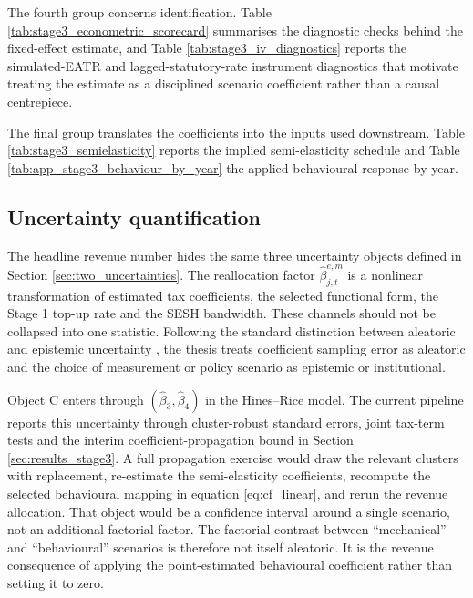 \documentclass[11pt,a4paper]{article}
\begin{document}




The fourth group concerns identification. Table \ref{tab:stage3_econometric_scorecard} summarises the diagnostic checks behind the fixed-effect estimate, and Table \ref{tab:stage3_iv_diagnostics} reports the simulated-EATR and lagged-statutory-rate instrument diagnostics that motivate treating the estimate as a disciplined scenario coefficient rather than a causal centrepiece.




The final group translates the coefficients into the inputs used downstream. Table \ref{tab:stage3_semielasticity} reports the implied semi-elasticity schedule and Table \ref{tab:app_stage3_behaviour_by_year} the applied behavioural response by year.




\subsection{Uncertainty quantification}\label{sec:beta_uncertainty}

The headline revenue number hides the same three uncertainty objects defined in Section \ref{sec:two_uncertainties}. The reallocation factor $\hat{\beta}_{j,t}^{e,m}$ is a nonlinear transformation of estimated tax coefficients, the selected functional form, the Stage 1 top-up rate and the SESH bandwidth. These channels should not be collapsed into one statistic. Following the standard distinction between aleatoric and epistemic uncertainty \citep{hullermeier2021}, the thesis treats coefficient sampling error as aleatoric and the choice of measurement or policy scenario as epistemic or institutional.

Object C enters through $(\hat{\beta}_3,\hat{\beta}_4)$ in the Hines--Rice model. The current pipeline reports this uncertainty through cluster-robust standard errors, joint tax-term tests and the interim coefficient-propagation bound in Section \ref{sec:results_stage3}. A full propagation exercise would draw the relevant clusters with replacement, re-estimate the semi-elasticity coefficients, recompute the selected behavioural mapping in equation \eqref{eq:cf_linear}, and rerun the revenue allocation. That object would be a confidence interval around a single scenario, not an additional factorial factor. The factorial contrast between ``mechanical'' and ``behavioural'' scenarios is therefore not itself aleatoric. It is the revenue consequence of applying the point-estimated behavioural coefficient rather than setting it to zero.
\end{document}
